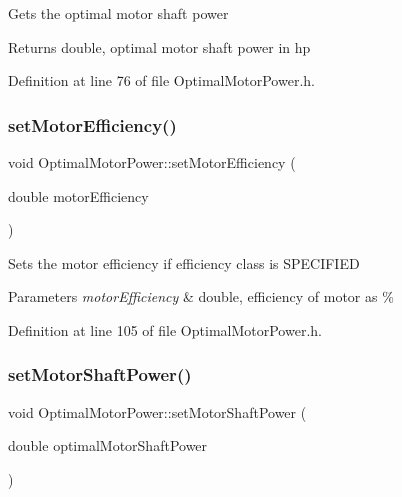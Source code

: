 Gets the optimal motor shaft power

\begin{DoxyReturn}{Returns}
double, optimal motor shaft power in hp 
\end{DoxyReturn}


Definition at line 76 of file Optimal\+Motor\+Power.\+h.

\mbox{\label{class_optimal_motor_power_a297acce2fcd06a57108fb52058a61cac}} 
\subsubsection{\texorpdfstring{set\+Motor\+Efficiency()}{setMotorEfficiency()}}
{\footnotesize\ttfamily void Optimal\+Motor\+Power\+::set\+Motor\+Efficiency (\begin{DoxyParamCaption}\item[{double}]{motor\+Efficiency }\end{DoxyParamCaption})\hspace{0.3cm}{\ttfamily [inline]}}

Sets the motor efficiency if efficiency class is S\+P\+E\+C\+I\+F\+I\+ED


\begin{DoxyParams}{Parameters}
{\em motor\+Efficiency} & double, efficiency of motor as \% \\
\hline
\end{DoxyParams}


Definition at line 105 of file Optimal\+Motor\+Power.\+h.

\mbox{\label{class_optimal_motor_power_ada8a9e3caac34c54470ad13ffe7edf53}} 
\subsubsection{\texorpdfstring{set\+Motor\+Shaft\+Power()}{setMotorShaftPower()}}
{\footnotesize\ttfamily void Optimal\+Motor\+Power\+::set\+Motor\+Shaft\+Power (\begin{DoxyParamCaption}\item[{double}]{optimal\+Motor\+Shaft\+Power }\end{DoxyParamCaption})\hspace{0.3cm}{\ttfamily [inline]}}

